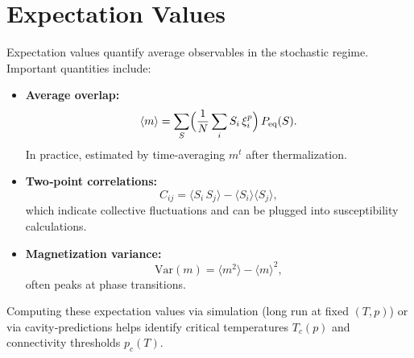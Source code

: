 \documentclass{article}
\begin{document}
\section{Expectation Values}
Expectation values quantify average observables in the stochastic regime.  Important quantities include:
\begin{itemize}
    \item \textbf{Average overlap:} 
    \[
      \langle m \rangle 
      = \sum_{S} \Bigl(\frac{1}{N}\sum_i S_i\,\xi_i^p\Bigr)\,P_{\mathrm{eq}}(S).
    \]
    In practice, estimated by time‐averaging $m^t$ after thermalization.
    \item \textbf{Two‐point correlations:} 
    \[
      C_{ij} 
      = \langle S_i\,S_j \rangle 
      - \langle S_i \rangle \langle S_j \rangle,
    \]
    which indicate collective fluctuations and can be plugged into susceptibility calculations.
    \item \textbf{Magnetization variance:} 
    \[
      \mathrm{Var}(m) 
      = \langle m^2 \rangle - \langle m\rangle^2,
    \]
    often peaks at phase transitions.
\end{itemize}
Computing these expectation values via simulation (long run at fixed $(T,p)$) or via cavity‐predictions helps identify critical temperatures $T_c(p)$ and connectivity thresholds $p_c(T)$.
\end{document}
